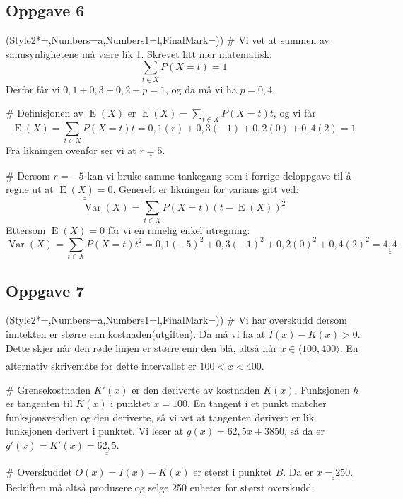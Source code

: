 \documentclass[12pt, a4paper]
{article}						%
\def\answer#1{\underline{\underline{#1}}}
\begin{document}
	\subsection*{Oppgave 6}
	\begin{easylist}[enumerate]
		\ListProperties(Style2*=,Numbers=a,Numbers1=l,FinalMark={)})
		# Vi vet at \answer{summen av sannsynlighetene må være lik 1.} Skrevet litt mer matematisk:
		\begin{equation*}
		\sum_{t \in X}P(X = t) = 1
		\end{equation*}
		Derfor får vi $0,1 + 0,3 + 0,2 + p = 1$, og da må vi ha $p = 0,4$.
		
		# Definisjonen av $\operatorname{E}(X)$ er $\operatorname{E}(X) = \sum_{t \in X}P(X = t)t$, og vi får
		\begin{equation*}
		\operatorname{E}(X) = \sum_{t \in X}P(X = t)t =  0,1(r) + 0,3(-1) + 0,2 (0) + 0,4(2) = 1
		\end{equation*}
		Fra likningen ovenfor ser vi at $\answer{r = 5}$.
		
		# Dersom $r = -5$ kan vi bruke samme tankegang som i forrige deloppgave til å regne ut at  $\answer{\operatorname{E}(X) = 0}$. Generelt er likningen for varians gitt ved:
		\begin{equation*}
		\operatorname{Var}(X) = \sum_{t \in X}P(X = t)(t - \operatorname{E}(X))^2 
		\end{equation*}
		Ettersom $\operatorname{E}(X) = 0$ får vi en rimelig enkel utregning:
		\begin{equation*}
		\operatorname{Var}(X) = \sum_{t \in X}P(X = t)t^2 =0,1(-5)^2 + 0,3(-1)^2 + 0,2(0)^2 +0,4(2)^2 = \answer{4,4}
		\end{equation*}
	\end{easylist}
	
	
	\subsection*{Oppgave 7}
	\begin{easylist}[enumerate]
		\ListProperties(Style2*=,Numbers=a,Numbers1=l,FinalMark={)})
		# Vi har overskudd dersom inntekten er større enn kostnaden(utgiften). 
		Da må vi ha at $I(x) - K(x) > 0$. Dette skjer når den røde linjen er større enn den blå,
		altså når $\answer{x \in \langle 100, 400 \rangle}$. 
		En alternativ skrivemåte for dette intervallet er $100 < x < 400$.
		
		# Grensekostnaden $K'(x)$ er den deriverte av kostnaden $K(x)$.
		Funksjonen $h$ er tangenten til $K(x)$ i punktet $x=100$.
		En tangent i et punkt matcher funksjonsverdien og den deriverte, så vi vet at 
		tangenten derivert er lik funksjonen derivert i punktet.
		Vi leser at $g(x) = 62,5x +3850$, så da er $g'(x) = K'(x) = \answer{62,5}$.
		
		# Overskuddet $O(x) = I(x) - K(x)$ er størst i punktet $B$. Da er $\answer{x = 250}$.
		Bedriften må altså produsere og selge 250 enheter for størst overskudd.
		
	\end{easylist}
	
\end{document}
